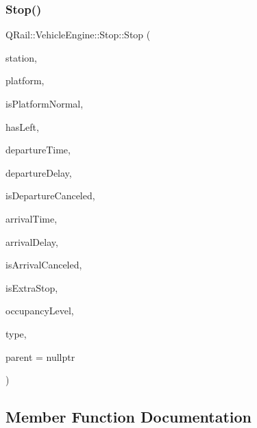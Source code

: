 \subsubsection{\texorpdfstring{Stop()}{Stop()}\hspace{0.1cm}{\footnotesize\ttfamily [2/2]}}
{\footnotesize\ttfamily Q\+Rail\+::\+Vehicle\+Engine\+::\+Stop\+::\+Stop (\begin{DoxyParamCaption}\item[{\mbox{\hyperlink{classQRail_1_1StationEngine_1_1Station}{Station\+Engine\+::\+Station}} $\ast$}]{station,  }\item[{const Q\+String \&}]{platform,  }\item[{const bool \&}]{is\+Platform\+Normal,  }\item[{const bool \&}]{has\+Left,  }\item[{const Q\+Date\+Time \&}]{departure\+Time,  }\item[{const qint16 \&}]{departure\+Delay,  }\item[{const bool \&}]{is\+Departure\+Canceled,  }\item[{const Q\+Date\+Time \&}]{arrival\+Time,  }\item[{const qint16 \&}]{arrival\+Delay,  }\item[{const bool \&}]{is\+Arrival\+Canceled,  }\item[{const bool \&}]{is\+Extra\+Stop,  }\item[{const \mbox{\hyperlink{classQRail_1_1VehicleEngine_1_1Stop_ad967ed81b19762bd582c1af07354a6d4}{Q\+Rail\+::\+Vehicle\+Engine\+::\+Stop\+::\+Occupancy\+Level}} \&}]{occupancy\+Level,  }\item[{const \mbox{\hyperlink{classQRail_1_1VehicleEngine_1_1Stop_af078938bc06ff906b6fc843d8c0206fa}{Q\+Rail\+::\+Vehicle\+Engine\+::\+Stop\+::\+Type}} \&}]{type,  }\item[{Q\+Object $\ast$}]{parent = {\ttfamily nullptr} }\end{DoxyParamCaption})\hspace{0.3cm}{\ttfamily [explicit]}}



\subsection{Member Function Documentation}
\mbox{\label{classQRail_1_1VehicleEngine_1_1Stop_a95e36a003e044cf7c454843bb9ea3f2c}} 
